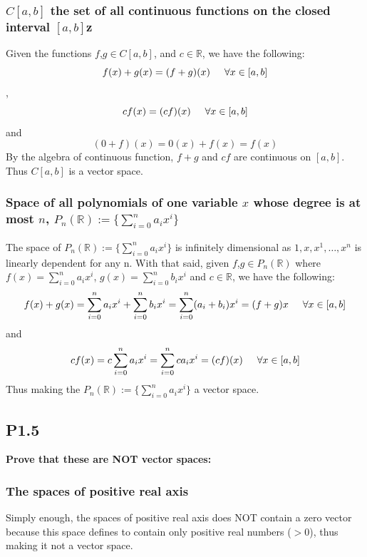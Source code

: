 \documentclass[12pt]{article}
\begin{document}
\subsubsection*{$C[a, b]$ the set of all continuous functions on the closed interval $[a, b]$z}
Given the functions $f$,$g \in C[a, b]$, and $c \in \mathbb{R}$, we have the following:
$$f(x)+g(x)=(f+g)(x) \hspace{5mm}\forall x \in [a, b]$$
, $$ cf(x)= (cf)(x) \hspace{5mm}\forall x \in [a, b]  $$
and $$ (0 + f)(x) = 0(x) + f(x) = f(x)$$
By the algebra of continuous function, $f+g$ and $cf$ are continuous on $[a,b]$. Thus $C[a, b]$ is a vector space.

\subsubsection*{Space of all polynomials of one variable $x$ whose degree is at most $n$, $P_n(\mathbb{R}):=\{\sum_{i=0}^n a_i x^i\}$}
The space of $P_n(\mathbb{R}):=\{\sum_{i=0}^n a_i x^i\}$ is infinitely dimensional as $1,x,x^1,\ldots,x^n$ is linearly dependent for any n. With that said, given $f$,$g \in P_n(\mathbb{R})$ where $f(x) = \sum_{i=0}^n a_i x^i$, $g(x) = \sum_{i=0}^n b_i x^i$  and $c \in \mathbb{R}$, we have the following:
$$ f(x) + g(x) =  \sum_{i=0}^n a_i x^i +\sum_{i=0}^n b_i x^i = \sum_{i=0}^n (a_i+b_i) x^i = (f + g)x \hspace{5mm}\forall x \in [a, b]$$
and 
$$ cf(x) = c\sum_{i=0}^n a_i x^i = \sum_{i=0}^n ca_i x^i= (cf)(x) \hspace{5mm}\forall x \in [a, b]$$
Thus making the $P_n(\mathbb{R}):=\{\sum_{i=0}^n a_i x^i\}$ a vector space.
	
\subsection*{P1.5}
{\bfseries Prove that these are NOT vector spaces:}
\subsubsection*{The spaces of positive real axis}
Simply enough, the spaces of positive real axis does NOT contain a zero vector because this space defines to contain only positive real numbers ($>0$), thus making it not a vector space.
\end{document}
